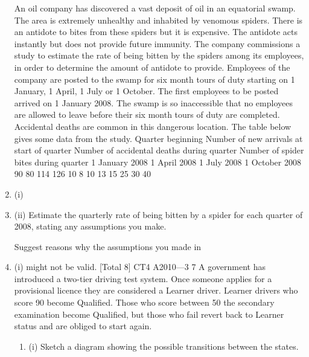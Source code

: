 \documentclass[a4paper,12pt]{article}
\begin{document}
\begin{enumerate}

 
An oil company has discovered a vast deposit of oil in an equatorial swamp. The area is extremely unhealthy and inhabited by venomous spiders. There is an antidote to bites from these spiders but it is expensive. The antidote acts
instantly but does not provide future immunity. The company commissions a study to estimate the rate of being bitten by the spiders among its employees, in order to determine the amount of antidote to provide.
Employees of the company are posted to the swamp for six month tours of duty starting on 1 January, 1 April, 1 July or 1 October. The first employees to be posted arrived on 1 January 2008. The swamp is so inaccessible that no employees are
allowed to leave before their six month tours of duty are completed.
Accidental deaths are common in this dangerous location. The table below gives some data from the study.
Quarter
beginning Number of new
arrivals at start
of quarter Number of
accidental deaths
during quarter Number of
spider bites
during quarter
1 January 2008
1 April 2008
1 July 2008
1 October 2008 90
80
114
126 10
8
10
13 15
25
30
40
\item (i)
\item (ii)
Estimate the quarterly rate of being bitten by a spider for each quarter of
2008, stating any assumptions you make.
 
Suggest reasons why the assumptions you made in \item (i) might not be valid.  
[Total 8]
CT4 A2010—3
7
A government has introduced a two-tier driving test system. Once someone applies for a provisional licence they are considered a Learner driver. Learner drivers who score 90%
become Qualified. Those who score between 50%
the secondary examination become Qualified, but those who fail revert back to Learner status and are obliged to start again.
\begin{enumerate}
\item (i) Sketch a diagram showing the possible transitions between the states.
 

\end{enumerate}
\end{enumerate}
\end{document}
